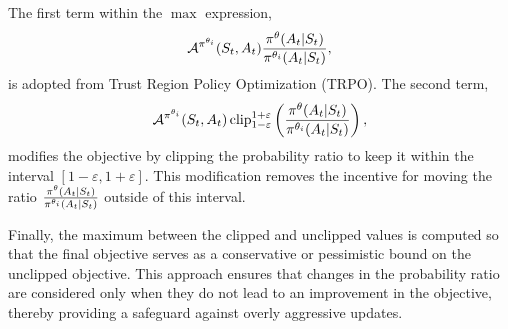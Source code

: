 \documentclass[12pt,twoside]{../../mitthesis}
\begin{document}
The first term within the $\max$ expression,
\begin{equation}
\mathcal A^{\pi^{\theta_i}}(S_t, A_t) \frac{\pi^{\theta}(A_t | S_t)}{\pi^{\theta_i}(A_t | S_t)},
\end{equation}
is adopted from Trust Region Policy Optimization (TRPO). The second term,
\begin{equation}
\mathcal A^{\pi^{\theta_i}}(S_t, A_t) \operatorname{clip}_{1-\varepsilon}^{1 + \varepsilon}\left(\frac{\pi^{\theta}(A_t | S_t)}{\pi^{\theta_i}(A_t | S_t)}\right),
\end{equation}
modifies the objective by clipping the probability ratio to keep it within the interval $[1 - \varepsilon, 1 + \varepsilon]$. This modification removes the incentive for moving the ratio $\frac{\pi^{\theta}(A_t | S_t)}{\pi^{\theta_i}(A_t | S_t)}$ outside of this interval.

Finally, the maximum between the clipped and unclipped values is computed so that the final objective serves as a conservative or pessimistic bound on the unclipped objective. This approach ensures that changes in the probability ratio are considered only when they do not lead to an improvement in the objective, thereby providing a safeguard against overly aggressive updates.
\end{document}
